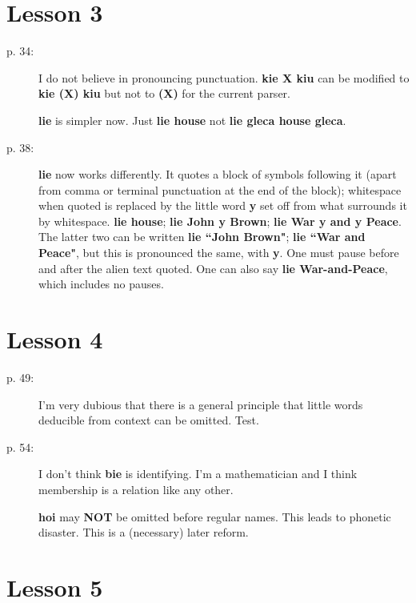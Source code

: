 \documentclass[12pt]{article}
\begin{document}
\section{Lesson 3}
\begin{description}
\item[p. 34:]  I do not believe in pronouncing punctuation.  {\bf kie X kiu} can be modified to {\bf kie (X) kiu} 
but not to {\bf (X)} for the current parser.

{\bf lie}  is simpler now.  Just {\bf lie house} not {\bf lie gleca house gleca}.

\item[p. 38:]  {\bf lie} now works differently.  It quotes a block of symbols following it (apart from comma or terminal punctuation at the end of the block);  whitespace when quoted is replaced by the little word {\bf y} set off from what surrounds it by whitespace.  {\bf lie house};  {\bf lie John y Brown}; {\bf lie War y and y Peace}.  The latter two
can be written {\bf lie ``John Brown"}; {\bf lie ``War and Peace"}, but this is pronounced the same, with {\bf y}.
One must pause before and after the alien text quoted.  One can also say {\bf lie War-and-Peace}, which includes no pauses.

\end{description}

\section{Lesson 4}

\begin{description}

\item[p. 49:]  I'm very dubious that there is a general principle that little words deducible from context can be omitted.  Test.
\item[p. 54:]  I don't think {\bf bie} is identifying.  I'm a mathematician and I think membership is a relation like any other.

{\bf hoi} may {\bf NOT} be omitted before regular names.  This leads to phonetic disaster.   This is a (necessary) later reform.



\end{description}

\section{Lesson 5}
\end{document}
